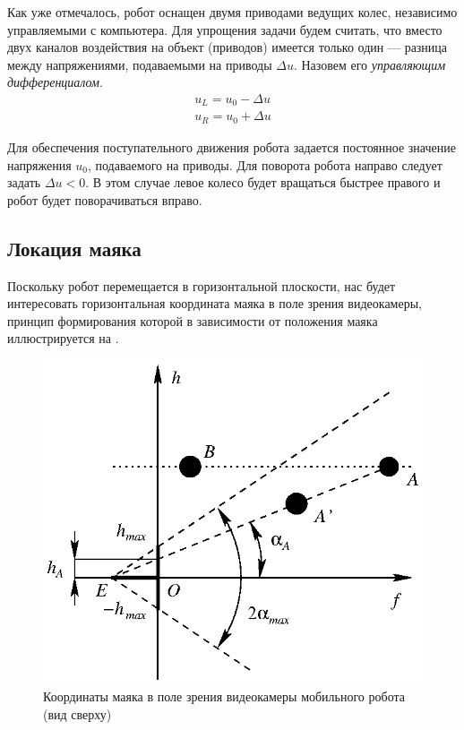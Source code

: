 Как уже отмечалось, робот оснащен двумя приводами ведущих колес,
независимо управляемыми с компьютера.  Для упрощения задачи будем
считать, что вместо двух каналов воздействия на объект (приводов)
имеется только один --- разница между напряжениями, подаваемыми на
приводы $\Delta u$.  Назовем его {\it управляющим дифференциалом}.
$$\begin{array}{l}
u_L=u_0-\Delta u\\
u_R=u_0+\Delta u
\end{array}$$

Для обеспечения поступательного движения робота задается постоянное
значение напряжения $u_0$, подаваемого на приводы.  Для поворота
робота направо следует задать $\Delta u<0$.  В этом случае левое
колесо будет вращаться быстрее правого и робот будет поворачиваться
вправо.

\subsection{Локация маяка}

Поскольку робот перемещается в горизонтальной плоскости, нас будет
интересовать горизонтальная координата маяка в поле зрения
видеокамеры, принцип формирования которой в зависимости от положения
маяка иллюстрируется на .
\begin{figure}
\centerline{\includegraphics{moby_eye_coord_h}}
\caption{Координаты маяка в поле зрения видеокамеры мобильного робота
         (вид сверху)}
\label{fig:moby_eye_coord}
\end{figure}

